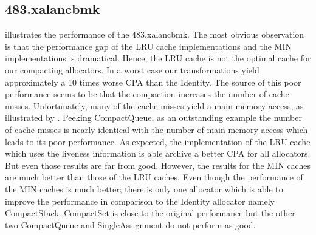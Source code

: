 \documentclass[onecolumn, openright, master, english, signatures]{dbrgrptt}
\begin{document}
\subsection{483.xalancbmk}
 illustrates the performance of the 483.xalancbmk.
The most obvious observation is that the performance gap of the \ac{LRU} cache implementations and the \ac{MIN} implementations is dramatical.
Hence, the \ac{LRU} cache is not the optimal cache for our compacting allocators.
In a worst case our transformations yield approximately a 10 times worse \ac{CPA} than the Identity.
The source of this poor performance seems to be that the compaction increases the number of cache misses.
Unfortunately, many of the cache misses yield a main memory access, as illustrated by .
Peeking CompactQueue, as an outstanding example the number of cache misses is nearly identical with the number of main memory access which leads to its poor performance.
As expected, the implementation of the \ac{LRU} cache which uses the liveness information is able archive a better \ac{CPA} for all allocators.
But even those results are far from good.
However, the results for the \ac{MIN} caches are much better than those of the \ac{LRU} caches.
Even though the performance of the \ac{MIN} caches is much better; there is only one allocator which is able to improve the performance in comparison to the Identity allocator namely CompactStack.
CompactSet is close to the original performance but the other two CompactQueue and SingleAssignment do not perform as good.
\end{document}
